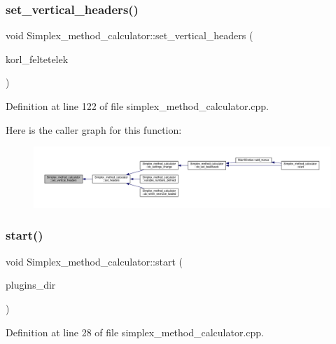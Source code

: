 \subsubsection{\texorpdfstring{set\+\_\+vertical\+\_\+headers()}{set\_vertical\_headers()}}
{\footnotesize\ttfamily void Simplex\+\_\+method\+\_\+calculator\+::set\+\_\+vertical\+\_\+headers (\begin{DoxyParamCaption}\item[{int}]{korl\+\_\+feltetelek }\end{DoxyParamCaption})\hspace{0.3cm}{\ttfamily [private]}}



Definition at line 122 of file simplex\+\_\+method\+\_\+calculator.\+cpp.

Here is the caller graph for this function\+:\nopagebreak
\begin{figure}[H]
\begin{center}
\leavevmode
\includegraphics[width=350pt]{classSimplex__method__calculator_a2c2f21414c20d27ac7ddb8249a2d852c_icgraph}
\end{center}
\end{figure}
\mbox{\label{classSimplex__method__calculator_acad83ff8660c546cad0f097a500a21fb}} 
\subsubsection{\texorpdfstring{start()}{start()}}
{\footnotesize\ttfamily void Simplex\+\_\+method\+\_\+calculator\+::start (\begin{DoxyParamCaption}\item[{const Q\+Dir \&}]{plugins\+\_\+dir }\end{DoxyParamCaption})}



Definition at line 28 of file simplex\+\_\+method\+\_\+calculator.\+cpp.

